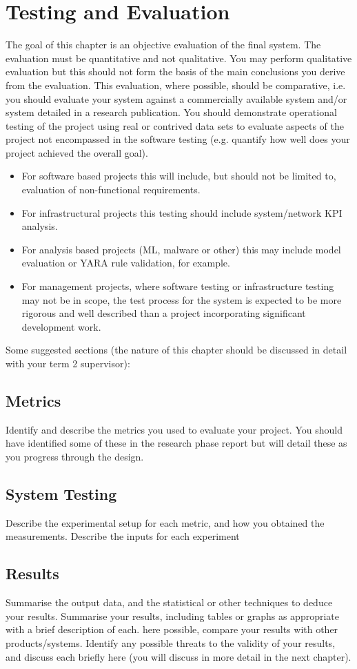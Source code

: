 \chapter{Testing and Evaluation}
\label{chap:eval}
The goal of this chapter is an objective evaluation of the final system. The evaluation must be quantitative and not qualitative. You may perform qualitative evaluation but this should not form the basis of the main conclusions you derive from the evaluation. This evaluation, where possible, should be comparative, i.e. you should evaluate your system against a commercially available system and/or system detailed in a research publication. You should demonstrate operational testing of the project using real or contrived data sets to evaluate aspects of the project not encompassed in the software testing (e.g. quantify how well does your project achieved the overall goal). 
\begin{itemize}
    \item For software based projects this will include, but should not be limited to, evaluation of non-functional requirements.
    \item For infrastructural projects this testing should include system/network KPI analysis.
    \item For analysis based projects (ML, malware or other) this may include model evaluation or YARA rule validation, for example.
    \item For management projects, where software testing or infrastructure testing may not be in scope, the test process for the system is expected to be more rigorous and well described than a project incorporating significant development work.
\end{itemize} 

Some suggested sections (the nature of this chapter should be discussed in detail with your term 2 supervisor):

\section{Metrics}
Identify and describe the metrics you used to evaluate your project. You should have identified some of these in the research phase report but will detail these as you progress through the design.

\section{System Testing}
Describe the experimental setup for each metric, and how you obtained the measurements. Describe the inputs for each experiment

\section{Results}
Summarise the output data, and the statistical or other techniques to deduce your results. Summarise your results, including tables or graphs as appropriate with a brief description of each. here possible, compare your results with other products/systems. Identify any possible threats to the validity of your results, and discuss each briefly here (you will discuss in more detail in the next chapter).